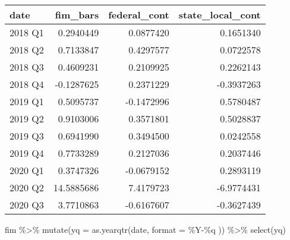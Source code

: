 \documentclass[
]{article}
\newenvironment{Shaded}{\begin{snugshade}}{\end{snugshade}}
\newcommand{\AttributeTok}[1]{\textcolor[rgb]{0.77,0.63,0.00}{#1}}
\newcommand{\FunctionTok}[1]{\textcolor[rgb]{0.00,0.00,0.00}{#1}}
\newcommand{\NormalTok}[1]{#1}
\newcommand{\SpecialCharTok}[1]{\textcolor[rgb]{0.00,0.00,0.00}{#1}}
\newcommand{\StringTok}[1]{\textcolor[rgb]{0.31,0.60,0.02}{#1}}
\begin{document}
\begin{tabular}{l|r|r|r}
\hline
date & fim\_bars & federal\_cont & state\_local\_cont\\
\hline
2018 Q1 & 0.2940449 & 0.0877420 & 0.1651340\\
\hline
2018 Q2 & 0.7133847 & 0.4297577 & 0.0722578\\
\hline
2018 Q3 & 0.4609231 & 0.2109925 & 0.2262143\\
\hline
2018 Q4 & -0.1287625 & 0.2371229 & -0.3937263\\
\hline
2019 Q1 & 0.5095737 & -0.1472996 & 0.5780487\\
\hline
2019 Q2 & 0.9103006 & 0.3571801 & 0.5028837\\
\hline
2019 Q3 & 0.6941990 & 0.3494500 & 0.0242558\\
\hline
2019 Q4 & 0.7733289 & 0.2127036 & 0.2037446\\
\hline
2020 Q1 & 0.3747326 & -0.0679152 & 0.2893119\\
\hline
2020 Q2 & 14.5885686 & 7.4179723 & -6.9774431\\
\hline
2020 Q3 & 3.7710863 & -0.6167607 & -0.3627439\\
\hline
\end{tabular}

\begin{Shaded}
\begin{Highlighting}[]
\NormalTok{fim }\SpecialCharTok{\%\textgreater{}\%}
  \FunctionTok{mutate}\NormalTok{(}\AttributeTok{yq =} \FunctionTok{as.yearqtr}\NormalTok{(date, }\AttributeTok{format =} \StringTok{\textquotesingle{}\%Y{-}\%q\textquotesingle{}}\NormalTok{ )) }\SpecialCharTok{\%\textgreater{}\%}
  \FunctionTok{select}\NormalTok{(yq)}
\end{Highlighting}
\end{Shaded}
\end{document}
